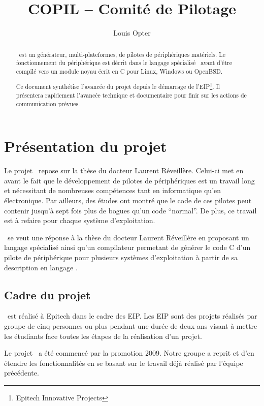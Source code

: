 \documentclass[francais]{rtxreport}
\author{Louis Opter} \title{COPIL -- Comité de Pilotage}
\begin{document}
\maketitle

\begin{abstract}
\rtx\ est un générateur, multi-plateformes, de pilotes de périphériques
matériels. Le fonctionnement du périphérique est décrit dans le langage
spécialisé \rtx\ avant d'être compilé vers un module noyau écrit en C pour
Linux, Windows ou OpenBSD.

Ce document synthétise l'avancée du projet depuis le démarrage de
l'EIP\footnote{Epitech Innovative Projects}. Il présentera rapidement l’avancée
technique et documentaire pour finir sur les actions de communication prévues.
\end{abstract}

\rtxmaketitleblock

\tableofcontents

\chapter{Présentation du projet}

Le projet \rtx\ repose sur la thèse du docteur Laurent Réveillère. Celui-ci met
en avant le fait que le développement de pilotes de périphériques est un travail
long et nécessitant de nombreuses compétences tant en informatique qu'en
électronique. Par ailleurs, des études ont montré que le code de ces pilotes
peut contenir jusqu'à sept fois plus de bogues qu'un code ``normal''. De plus,
ce travail est à refaire pour chaque système d'exploitation.

\rtx\ se veut une réponse à la thèse du docteur Laurent Réveillère en proposant
un langage spécialisé ainsi qu'un compilateur permetant de générer le code C
d'un pilote de périphérique pour plusieurs systèmes d'exploitation à partir de
sa description en langage \rtx.

\section{Cadre du projet}
\rtx\ est réalisé à Epitech dans le cadre des EIP. Les EIP sont des projets
réalisés par groupe de cinq personnes ou plus pendant une durée de deux ans
visant à mettre les étudiants face toutes les étapes de la réalisation d'un
projet.

Le projet \rtx\ a été commencé par la promotion 2009. Notre groupe a reprit et
d'en étendre les fonctionnalités en se basant sur le travail déjà réalisé par
l'équipe précédente.
\end{document}
